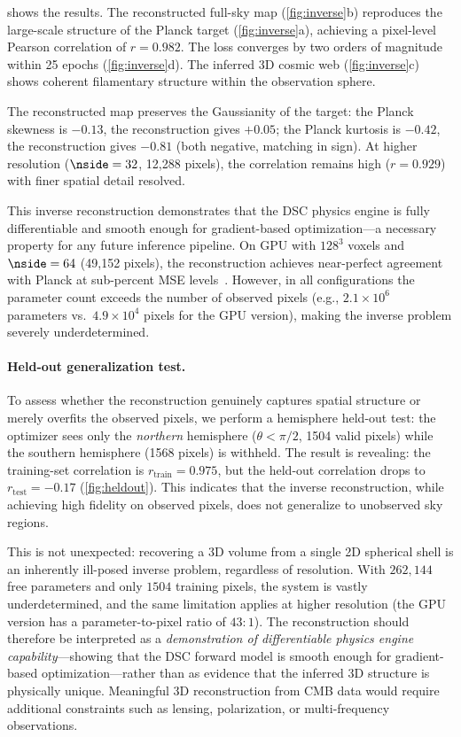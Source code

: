  shows the results.
The reconstructed full-sky map (\cref{fig:inverse}b) reproduces the large-scale structure of the Planck target (\cref{fig:inverse}a), achieving a pixel-level Pearson correlation of $r = 0.982$.
The loss converges by two orders of magnitude within 25 epochs (\cref{fig:inverse}d).
The inferred 3D cosmic web (\cref{fig:inverse}c) shows coherent filamentary structure within the observation sphere.

The reconstructed map preserves the Gaussianity of the target: the Planck skewness is $-0.13$, the reconstruction gives $+0.05$; the Planck kurtosis is $-0.42$, the reconstruction gives $-0.81$ (both negative, matching in sign).
At higher resolution ($\nside = 32$, 12{,}288 pixels), the correlation remains high ($r = 0.929$) with finer spatial detail resolved.

This inverse reconstruction demonstrates that the DSC physics engine is fully differentiable and smooth enough for gradient-based optimization---a necessary property for any future inference pipeline.
On GPU with $128^3$ voxels and $\nside = 64$ (49{,}152 pixels), the reconstruction achieves near-perfect agreement with Planck at sub-percent MSE levels~\citep{Wang2026}.
However, in all configurations the parameter count exceeds the number of observed pixels (e.g., $2.1 \times 10^6$ parameters vs.\ $4.9 \times 10^4$ pixels for the GPU version), making the inverse problem severely underdetermined.

\paragraph{Held-out generalization test.}
To assess whether the reconstruction genuinely captures spatial structure or merely overfits the observed pixels, we perform a hemisphere held-out test: the optimizer sees only the \emph{northern} hemisphere ($\theta < \pi/2$, 1504 valid pixels) while the southern hemisphere (1568 pixels) is withheld.
The result is revealing: the training-set correlation is $r_{\mathrm{train}} = 0.975$, but the held-out correlation drops to $r_{\mathrm{test}} = -0.17$ (\cref{fig:heldout}).
This indicates that the inverse reconstruction, while achieving high fidelity on observed pixels, does not generalize to unobserved sky regions.

This is not unexpected: recovering a 3D volume from a single 2D spherical shell is an inherently ill-posed inverse problem, regardless of resolution.
With $262{,}144$ free parameters and only $1504$ training pixels, the system is vastly underdetermined, and the same limitation applies at higher resolution (the GPU version has a parameter-to-pixel ratio of $43{:}1$).
The reconstruction should therefore be interpreted as a \emph{demonstration of differentiable physics engine capability}---showing that the DSC forward model is smooth enough for gradient-based optimization---rather than as evidence that the inferred 3D structure is physically unique.
Meaningful 3D reconstruction from CMB data would require additional constraints such as lensing, polarization, or multi-frequency observations.

